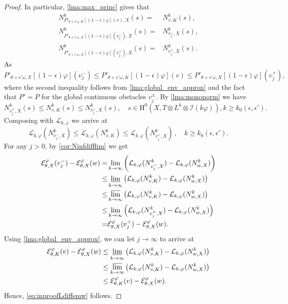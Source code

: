 \begin{proof}
In particular, \cref{lma:max_princ} gives that
\[
\begin{aligned}
N^k_{P'_{\theta + \epsilon'\omega,K}[(1-\epsilon)\varphi](v),X}(s)=& N^k_{v,K}(s),\\
N^k_{P'_{\theta + \epsilon'\omega,X}[(1-\epsilon)\varphi](v_{j}^-),X}(s)=& N^k_{v_{j}^-,X}(s),\\
N^k_{P'_{\theta + \epsilon'\omega,X}[(1-\epsilon)\varphi](v_{j}^+),X}(s)=& N^k_{v^+_{j},X}(s).
\end{aligned}
\]
As
\[
P'_{\theta + \epsilon'\omega,X}[(1-\epsilon)\varphi](v_{j}^-) \leq P'_{\theta + \epsilon'\omega,K}[(1-\epsilon)\varphi](v) \leq P'_{\theta + \epsilon'\omega,X}[(1-\epsilon)\varphi](v_{j}^+),
\]
where the second inequality follows from \cref{lma:global_env_approx} and the fact that $P'=P$ for the global continuous obstacles $v_j^\pm$. By \cref{lma:mononorm} we have
\[
N^k_{v^+_{j},X}(s) \leq N^k_{v,K}(s) \leq N^k_{v_{j}^-,X}(s), \quad s \in \mathrm{H}^0(X,T \otimes L^k  \otimes \mathcal{I}(k\varphi)), k \geq k_0(\epsilon,\epsilon').
\]
Composing with $\mathcal{L}_{k,\varphi}$ we arrive at
\[
\mathcal{L}_{k,\varphi}(N^k_{v^-_{j},X})\leq  \mathcal{L}_{k,\varphi}(N^k_{v,K})\leq  \mathcal{L}_{k,\varphi}(N^k_{v^+_{j},X})\,, \quad k \geq k_0(\epsilon,\epsilon').
\]
For any $j>0$, by \cref{cor:Ninfdifflim} we get
\[
\begin{aligned}
\mathcal{E}_{\theta,X}^{\varphi}(v^-_{j}) - \mathcal{E}_{\theta,X}^{\varphi}(w)=& \lim_{k\to\infty} \left(\mathcal{L}_{k,\varphi}(N^k_{v^-_{j},X})-\mathcal{L}_{k,\varphi}(N^k_{w,X})\right)\\
\leq & \varliminf_{k\to\infty}\left(\mathcal{L}_{k,\varphi}(N^k_{v,K})- \mathcal{L}_{k,\varphi}(N^k_{w,X})\right)\\
\leq & \varlimsup_{k\to\infty}\left(\mathcal{L}_{k,\varphi}(N^k_{v,K})- \mathcal{L}_{k,\varphi}(N^k_{w,X})\right)\\
\leq & \lim_{k\to\infty} \left(\mathcal{L}_{k,\varphi}(N^k_{v^+_{j},X})-\mathcal{L}_{k,\varphi}(N^k_{w,X})\right)\\
=&  \mathcal{E}_{\theta,X}^{\varphi}(v^+_{j}) - \mathcal{E}_{\theta,X}^{\varphi}(w).
\end{aligned}
\]
Using \cref{lma:global_env_approx}, we can let $j \to \infty$ to arrive at
\[
\begin{split}
\mathcal{E}_{\theta,K}^{\varphi}(v)  -\mathcal{E}_{\theta,X}^{\varphi}(w) &\leq \varliminf_{k\to\infty}\left(\mathcal{L}_{k,\varphi}(N^k_{v,K})- \mathcal{L}_{k,\varphi}(N^k_{w,X})\right)\\
&\leq\varlimsup_{k\to\infty}\left(\mathcal{L}_{k,\varphi}(N^k_{v,K})- \mathcal{L}_{k,\varphi}(N^k_{w,X})\right)\\
& \leq \mathcal{E}_{\theta,K}^{\varphi}(v)  -\mathcal{E}_{\theta,X}^{\varphi}(w).
\end{split}
\]
Hence, \eqref{eq:inproofLdiffsmw} follows.
\end{proof}






